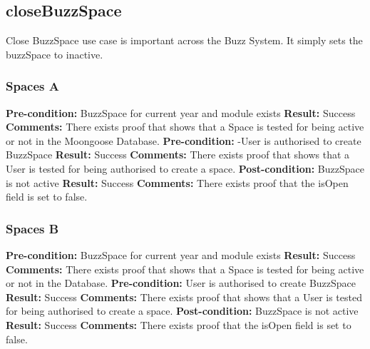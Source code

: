 
\newpage
\subsection{closeBuzzSpace}

Close BuzzSpace use case is important across the Buzz System. It simply sets the buzzSpace to inactive.  \newline 

\subsubsection{Spaces A}
\textbf{Pre-condition:}  BuzzSpace for current year and module exists  \newline
\textbf{Result:}  Success \newline
\textbf{Comments:}  There exists  proof that shows that a  Space is tested for being active or not in the Moongoose Database.\newline
\textbf{Pre-condition:}  -User is authorised to create BuzzSpace  \newline
\textbf{Result:}  Success \newline
\textbf{Comments:}  There exists  proof that shows that a  User is tested for being authorised to create a space.\newline
\textbf{Post-condition:}  BuzzSpace is not active  \newline
\textbf{Result:}  Success \newline
\textbf{Comments:}  There exists  proof that the isOpen field is set to false.\newline
\subsubsection{Spaces B}
\textbf{Pre-condition:}  BuzzSpace for current year and module exists  \newline
\textbf{Result:}  Success \newline
\textbf{Comments:}  There exists  proof that shows that a  Space is tested for being active or not in the Database.\newline 
\textbf{Pre-condition:}  User is authorised to create BuzzSpace  \newline
\textbf{Result:}  Success \newline
\textbf{Comments:}  There exists  proof that shows that a  User is tested for being authorised to create a space.\newline
\textbf{Post-condition:}  BuzzSpace is not active  \newline
\textbf{Result:}  Success \newline
\textbf{Comments:}  There exists  proof that the isOpen field is set to false. \newline

